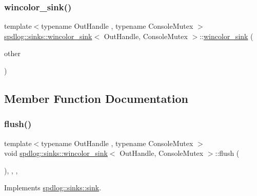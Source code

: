 \subsubsection{\texorpdfstring{wincolor\+\_\+sink()}{wincolor\_sink()}\hspace{0.1cm}{\footnotesize\ttfamily [2/2]}}
{\footnotesize\ttfamily template$<$typename Out\+Handle , typename Console\+Mutex $>$ \\
\hyperlink{classspdlog_1_1sinks_1_1wincolor__sink}{spdlog\+::sinks\+::wincolor\+\_\+sink}$<$ Out\+Handle, Console\+Mutex $>$\+::\hyperlink{classspdlog_1_1sinks_1_1wincolor__sink}{wincolor\+\_\+sink} (\begin{DoxyParamCaption}\item[{const \hyperlink{classspdlog_1_1sinks_1_1wincolor__sink}{wincolor\+\_\+sink}$<$ Out\+Handle, Console\+Mutex $>$ \&}]{other }\end{DoxyParamCaption})\hspace{0.3cm}{\ttfamily [delete]}}



\subsection{Member Function Documentation}
\mbox{\label{classspdlog_1_1sinks_1_1wincolor__sink_a3746a35fc36218e76dc3080e52fe6233}} 
\subsubsection{\texorpdfstring{flush()}{flush()}}
{\footnotesize\ttfamily template$<$typename Out\+Handle , typename Console\+Mutex $>$ \\
void \hyperlink{classspdlog_1_1sinks_1_1wincolor__sink}{spdlog\+::sinks\+::wincolor\+\_\+sink}$<$ Out\+Handle, Console\+Mutex $>$\+::flush (\begin{DoxyParamCaption}{ }\end{DoxyParamCaption})\hspace{0.3cm}{\ttfamily [inline]}, {\ttfamily [final]}, {\ttfamily [override]}, {\ttfamily [virtual]}}



Implements \hyperlink{classspdlog_1_1sinks_1_1sink_a8a0674ae3bca8f1617aef820e23a2ccd}{spdlog\+::sinks\+::sink}.



